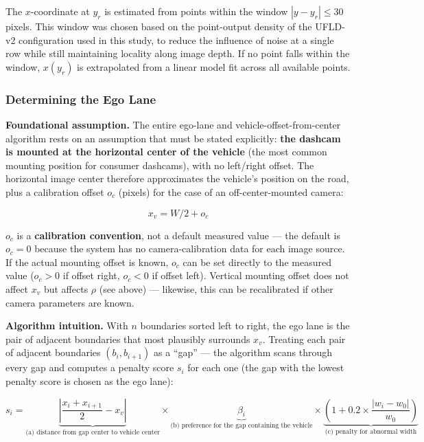 \documentclass[12pt,a4paper]{report}
\begin{document}
The $x$-coordinate at $y_r$ is estimated from points within the window $|y-y_r|\le30$ pixels. This window was chosen based on the point-output density of the UFLD-v2 configuration used in this study, to reduce the influence of noise at a single row while still maintaining locality along image depth. If no point falls within the window, $x(y_r)$ is extrapolated from a linear model fit across all available points.

\subsubsection*{Determining the Ego Lane}

\textbf{Foundational assumption.} The entire ego-lane and vehicle-offset-from-center algorithm rests on an assumption that must be stated explicitly: \textbf{the dashcam is mounted at the horizontal center of the vehicle} (the most common mounting position for consumer dashcams), with no left/right offset. The horizontal image center therefore approximates the vehicle's position on the road, plus a calibration offset $o_c$ (pixels) for the case of an off-center-mounted camera:

\[
x_v = W/2 + o_c
\]

$o_c$ is a \textbf{calibration convention}, not a default measured value --- the default is $o_c=0$ because the system has no camera-calibration data for each image source. If the actual mounting offset is known, $o_c$ can be set directly to the measured value ($o_c>0$ if offset right, $o_c<0$ if offset left). Vertical mounting offset does not affect $x_v$ but affects $\rho$ (see above) --- likewise, this can be recalibrated if other camera parameters are known.

\textbf{Algorithm intuition.} With $n$ boundaries sorted left to right, the ego lane is the pair of adjacent boundaries that most plausibly surrounds $x_v$. Treating each pair of adjacent boundaries $(b_i, b_{i+1})$ as a ``gap'' --- the algorithm scans through every gap and computes a penalty score $s_i$ for each one (the gap with the lowest penalty score is chosen as the ego lane):

\[
s_i = \underbrace{\left| \frac{x_i + x_{i+1}}{2} - x_v \right|}_{\text{(a) distance from gap center to vehicle center}} \times \underbrace{\beta_i}_{\text{(b) preference for the gap containing the vehicle}} \times \underbrace{\left(1 + 0.2 \times \frac{|w_i - w_0|}{w_0}\right)}_{\text{(c) penalty for abnormal width}}
\]
\end{document}
